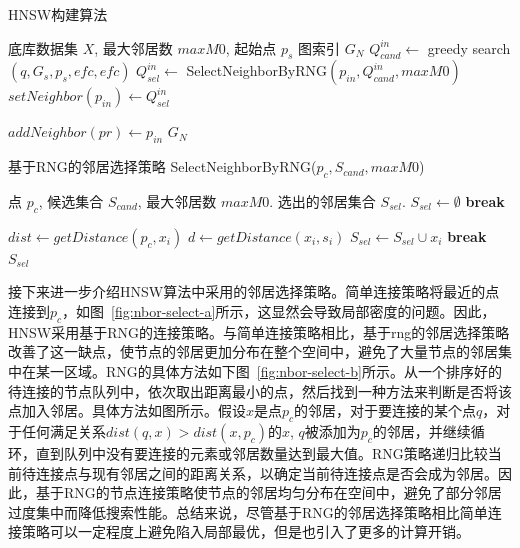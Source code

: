 \begin{algorithm}
    \caption{HNSW构建算法}
    \label{alg:construct} 
    \begin{algorithmic}[1]
        \REQUIRE
        底库数据集 $X$, 最大邻居数 $maxM0$, 起始点 $p_s$
        \ENSURE
        图索引 $G_N$
        \STATE $Q_{cand}^{in} \gets$ greedy search$(q,G_s,p_s,efc,efc)$
        \STATE $Q_{sel}^{in} \gets$ SelectNeighborByRNG$(p_{in},Q_{cand}^{in},maxM0)$
        \STATE $setNeighbor(p_{in}) \gets Q_{sel}^{in}$
        
        \STATE $addNeighbor(pr) \gets p_{in}$
        \ENDFOR
        \ENDFOR
        \RETURN $G_N$
    \end{algorithmic} 
\end{algorithm}

\begin{algorithm}
    \caption{基于RNG的邻居选择策略 SelectNeighborByRNG($p_c,S_{cand},maxM0$)}
    \label{alg:RNG}
    \begin{algorithmic}[1]
        \REQUIRE
        点 $p_c$, 候选集合 $S_{cand}$, 最大邻居数 $maxM0$.
        \ENSURE
        选出的邻居集合 $S_{sel}$.
        \STATE $S_{sel} \gets \emptyset$
        \STATE \textbf{break}
        \ENDIF
        
        \STATE $dist \gets getDistance(p_c, x_i)$
        \STATE $d \gets getDistance(x_i, s_i)$
        \STATE $S_{sel} \gets S_{sel} \cup x_i$
        \ELSE
        \STATE \textbf{break}
        \ENDIF
        \ENDFOR
        \ENDFOR
        \RETURN $S_{sel}$
    \end{algorithmic} 
\end{algorithm}

接下来进一步介绍HNSW算法中采用的邻居选择策略。简单连接策略将最近的点连接到$p_c$，如图~\ref{fig:nbor-select-a}所示，这显然会导致局部密度的问题。因此，HNSW采用基于RNG的连接策略。与简单连接策略相比，基于rng的邻居选择策略改善了这一缺点，使节点的邻居更加分布在整个空间中，避免了大量节点的邻居集中在某一区域。RNG的具体方法如下图~\ref{fig:nbor-select-b}所示。从一个排序好的待连接的节点队列中，依次取出距离最小的点，然后找到一种方法来判断是否将该点加入邻居。具体方法如图所示。假设$x$是点$p_c$的邻居，对于要连接的某个点$q$，对于任何满足关系$dist(q,x)>dist(x,p_c)$的$x$, $q$被添加为$p_c$的邻居，并继续循环，直到队列中没有要连接的元素或邻居数量达到最大值。RNG策略递归比较当前待连接点与现有邻居之间的距离关系，以确定当前待连接点是否会成为邻居。因此，基于RNG的节点连接策略使节点的邻居均匀分布在空间中，避免了部分邻居过度集中而降低搜索性能。总结来说，尽管基于RNG的邻居选择策略相比简单连接策略可以一定程度上避免陷入局部最优，但是也引入了更多的计算开销。


